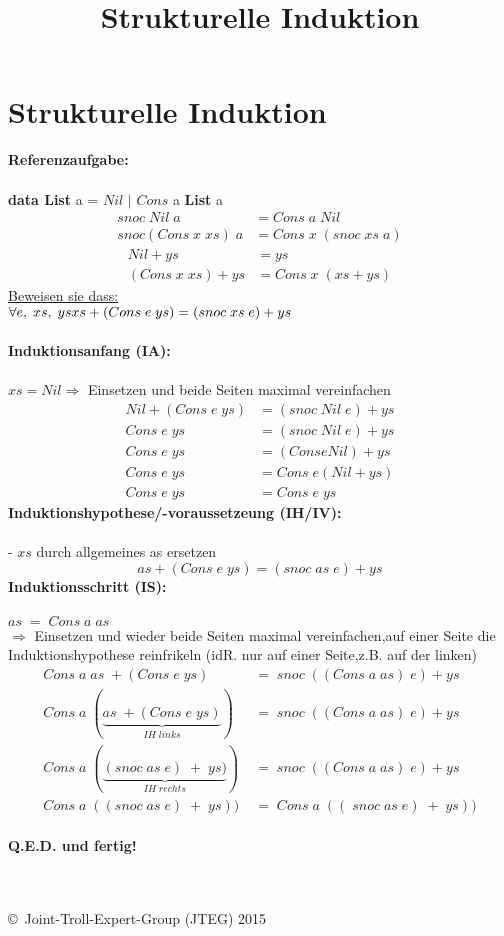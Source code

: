 \documentclass{article}
\title{Strukturelle Induktion}
\date{ }
\begin{document}
	\section*{Strukturelle Induktion}
	\textbf{Referenzaufgabe:} \\
		\\
		\textbf{data List} a = $Nil$ $|$ $Cons$ a \textbf{List} a
		\begin{align*}
			snoc\;Nil\;a 			&= Cons\;a\;Nil\\
			snoc(Cons\;x\;xs)\;a	&= Cons\;x\;(snoc\;xs\;a)
		\end{align*}
		\begin{align*}
			Nil + ys 			&= ys\\
			(Cons\;x\;xs) + ys 	&= Cons\;x\;(xs + ys)
		\end{align*}
		\underline{Beweisen sie dass:}\\
		$\forall e,\;xs,\;ys\\xs+(Cons\;e\;ys) = (snoc\;xs\;e)+ys$ \\\\
	\textbf{Induktionsanfang (IA):}\\\\
		$xs = Nil$\;\;$\Rightarrow$ Einsetzen und beide Seiten maximal vereinfachen
	\begin{align*}
		Nil+(Cons\;e\;ys) 	&= (snoc\;Nil\;e)+ys\\
			 Cons\;e\;ys	&= (snoc\;Nil\;e)+ys\\
			 Cons\;e\;ys	&= (Cons e Nil) + ys\\
			 Cons\;e\;ys	&= Cons\;e (Nil + ys)\\
			 Cons\;e\;ys	&= Cons\;e\;ys
	\end{align*}
	\textbf{Induktionshypothese/-voraussetzeung (IH/IV):}\\\\
	- $xs$ durch allgemeines as ersetzen
	\[as+(Cons\;e\;ys) = (snoc\;as\;e)+ys\]
\newpage
	\textbf{Induktionsschritt (IS):}\\\\
	$as\;=\;Cons\;a\;as$\\$\Rightarrow$ Einsetzen und wieder beide Seiten maximal vereinfachen,auf einer Seite die Induktionshypothese reinfrikeln (idR. nur auf einer Seite,z.B. auf der linken)
	\begin{align*}
		Cons\;a\;as\;+(Cons\;e\;ys)\;&=\;snoc\;((Cons\;a\;as)\;e)+ys \\
		Cons\;a\;(\underbrace{as\;+(Cons\;e\;ys)}_{IH\;links})\;&=\;snoc\;((Cons\;a\;as)\;e)+ys\\
		Cons\;a\;(\underbrace{(snoc\;as\;e)\;+\;ys)}_{IH\;rechts})\;&=\;snoc\;((Cons\;a\;as)\;e)+ys\\
		Cons\;a\;((snoc\;as\;e)\;+\;ys))\;&=\;Cons\;a\;((\;snoc\;as\;e)\;+\;ys))
	\end{align*}\\
\textbf{Q.E.D. und fertig!}\\
\\\\
	\begin{tiny}
	\copyright\ Joint-Troll-Expert-Group (JTEG) 2015
	\end{tiny}
\end{document}
